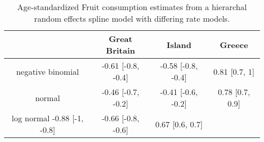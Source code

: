     \begin{table}[h]
        \begin{center}
        \begin{tabular}{|c|c|c|c|}
            \hline
                & Great Britain & Island & Greece \\
            \hline
                negative binomial & -0.61 [-0.8, -0.4] & -0.58 [-0.8, -0.4] & 0.81 [0.7, 1] \\
                normal & -0.46 [-0.7, -0.2] & -0.41 [-0.6, -0.2] & 0.78 [0.7, 0.9] \\
                log normal -0.88 [-1, -0.8] & -0.66 [-0.8, -0.6] & 0.67 [0.6, 0.7] \\
            \hline
        \end{tabular}
        \end{center}
        \caption{ Age-standardized Fruit consumption estimates
          from a hierarchal random effects spline model with differing
          rate models.}
        \label{tab:app-hepc global rfx}
    \end{table}



 